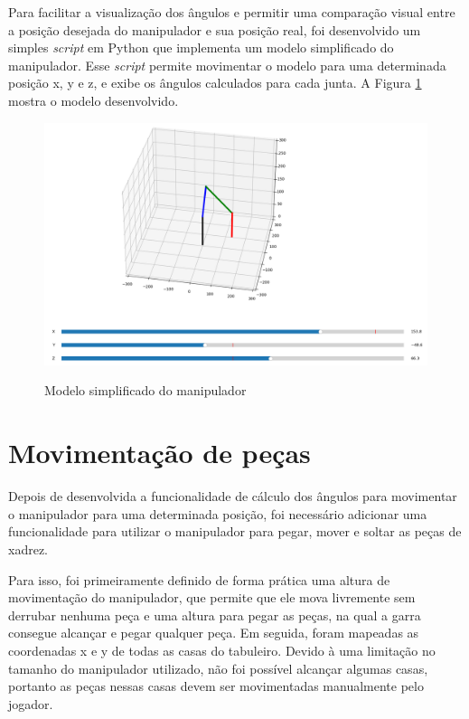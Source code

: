 Para facilitar a visualização dos ângulos e permitir uma comparação visual entre a posição desejada do manipulador e sua posição real,
foi desenvolvido um simples \textit{script} em Python que implementa um modelo simplificado do manipulador.
Esse \textit{script} permite movimentar o modelo para uma determinada posição x, y e z, e exibe os ângulos calculados para cada junta.
A Figura \ref{fig:modeloManipulador} mostra o modelo desenvolvido.

\begin{figure}[H]
    \centering
    \caption{Modelo simplificado do manipulador}
    \includegraphics[keepaspectratio=true, width=1\textwidth]
    	{img/modelo-manipulador.png}
    \label{fig:modeloManipulador}
\end{figure}

\section[Movimentação de peças]{Movimentação de peças}
\label{sec:movimentacaoPecas}

Depois de desenvolvida a funcionalidade de cálculo dos ângulos para movimentar o manipulador para uma determinada posição, foi necessário adicionar uma funcionalidade para utilizar o manipulador para pegar, mover e soltar as peças de xadrez.

Para isso, foi primeiramente definido de forma prática uma altura de movimentação do manipulador, que permite que ele mova livremente sem derrubar nenhuma peça e 
uma altura para pegar as peças, na qual a garra consegue alcançar e pegar qualquer peça.
Em seguida, foram mapeadas as coordenadas x e y de todas as casas do tabuleiro. Devido à uma limitação no tamanho do manipulador utilizado, não foi possível alcançar algumas casas, portanto as peças nessas casas devem ser movimentadas manualmente pelo jogador.

